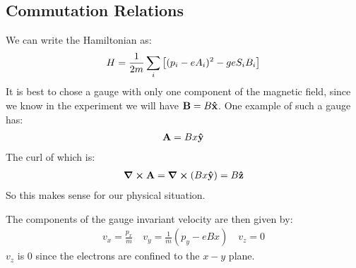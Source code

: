 \subsection{Commutation Relations}
We can write the Hamiltonian as:
\begin{align*}
  H=\frac1{2m}\sum_i\qty[(p_i-eA_i)^2-geS_iB_i]
\end{align*}
It is best to chose a gauge with only one component of the magnetic field, since we know in the experiment we will have $\vb{B}=B\vu{x}$. One example of such a gauge has:
\begin{align*}
  \vb{A}=Bx\vu{y}
\end{align*}
The curl of which is:
\begin{align*}
  \curl{\vb{A}}=\curl{(Bx\vu{y})}=B\vu{z}
\end{align*}
So this makes sense for our physical situation.

The components of the gauge invariant velocity are then given by:
\begin{align*}
  v_x=\frac{p_x}{m}\quad v_y=\frac1m(p_y-eBx)\quad v_z=0
\end{align*}
$v_z$ is 0 since the electrons are confined to the $x-y$ plane.

